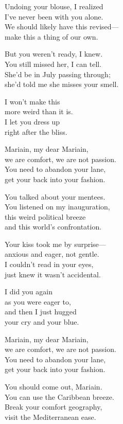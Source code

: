 \begin{lyrics}
Undoing your blouse, I realized\\
I've never been with you alone.\\
We should likely have this revised—\\
make this a thing of our own.

But you weren't ready, I knew.\\
You still missed her, I can tell.\\
She'd be in July passing through;\\
she'd told me she misses your smell.

I won't make this\\
more weird than it is.\\
I let you dress up\\
right after the bliss.

Mariain, my dear Mariain,\\
we are comfort, we are not passion.\\
You need to abandon your lane,\\
get your back into your fashion.

You talked about your mentees.\\
You listened on my inauguration,\\
this weird political breeze\\
and this world's confrontation.

Your kiss took me by surprise—\\
anxious and eager, not gentle.\\
I couldn't read in your eyes,\\
just knew it wasn't accidental.

I did you again\\
as you were eager to,\\
and then I just hugged\\
your cry and your blue.

Mariain, my dear Mariain,\\
we are comfort, we are not passion.\\
You need to abandon your lane,\\
get your back into your fashion.

You should come out, Mariain.\\
You can use the Caribbean breeze.\\
Break your comfort geography,\\
visit the Mediterranean ease.


\end{lyrics}
